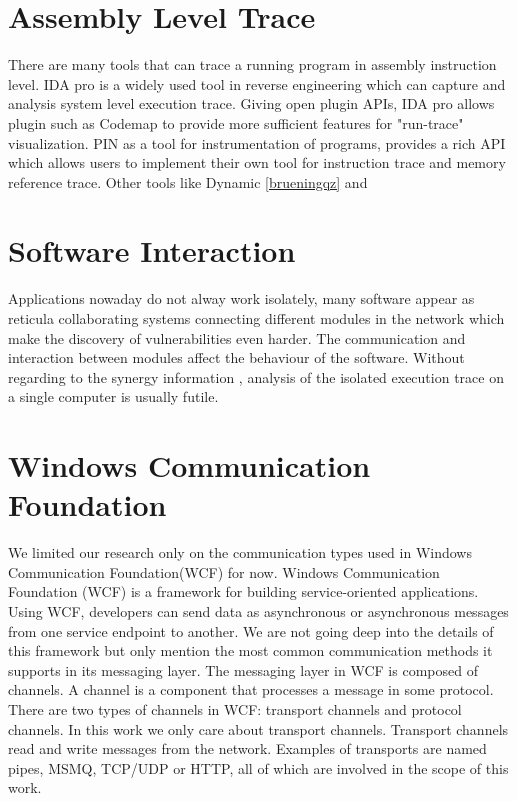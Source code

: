 \section{Assembly Level Trace}
There are many tools that can trace a running program in assembly instruction level.  IDA pro \cite{eagle_ida_2008} is a widely used tool in reverse engineering which can capture and analysis system level execution trace. Giving open plugin APIs, IDA pro allows plugin such as Codemap \cite{_c0demap/codemap:_????} to provide more sufficient features for "run-trace" visualization. PIN\cite{_pin_????} as a tool for instrumentation of programs, provides a rich API which allows users to implement their own tool for instruction trace and memory reference trace. Other tools like Dynamic \ref{brueningqz} and 
\section{Software Interaction}
Applications nowaday do not alway work isolately,  many software  appear as  reticula collaborating systems connecting different modules in the network\cite{PhysRevE.68.046116} which make the discovery of vulnerabilities even harder. The communication and interaction between modules affect the behaviour of the software. Without regarding to the synergy information , analysis of the isolated execution trace on a single computer is usually futile. 

\section{Windows Communication Foundation}
We limited our research only on the communication types used in Windows Communication Foundation(WCF) for now. Windows Communication Foundation (WCF) is a framework for building service-oriented applications. Using WCF, developers can send data as asynchronous or asynchronous messages from one service endpoint to another. We are not going deep into the details of this framework but only mention the most common communication methods it supports in its messaging layer. The messaging layer in WCF is composed of channels. A channel is a component that processes a message in some protocol. There are two types of channels in WCF: transport channels and protocol channels. In this work we only care about transport channels. Transport channels read and write messages from the network. Examples of transports are named pipes, MSMQ, TCP/UDP or HTTP, all of which are involved in the scope of this work.


